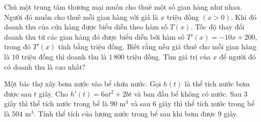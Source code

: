 \begin{bt}%
	Chủ một trung tâm thương mại muốn cho thuê một số gian hàng như nhau. Người đó muốn cho thuê mỗi gian  hàng với giá là $x$ triệu đồng $(x>0)$. Khi đó doanh thu của cửa hàng được biểu diễn theo hàm số $T(x)$. Tốc độ thay đổi doanh thu từ các gian hàng đó được biểu diễn bởi hàm số $T'(x)=-10x+200$, trong đó $T'(x)$ tính bằng triệu đồng. Biết rằng nếu giá thuê cho mỗi gian hàng là $10$ triệu đồng thì doanh thu là $1\,800$ triệu đồng. Tìm giá trị của $x$ để người đó có doanh thu là cao nhất?
\end{bt}

\begin{bt}%
	Một bác thợ xây bơm nước vào bể chứa nước. Gọi $h(t)$ là thể tích nước bơm được sau $t$ giây. Cho $h'(t)=6at^2+2bt$ và ban  đầu bể không có nước. Sau $3$ giây thì thể tích nước trong bể là $90$ m$^3$ và sau $6$ giây thì thể tích nước trong bể là $504$ m$^3$. Tính thể tích của lượng nước trong bể sau khi bơm được $9$ giây.
\end{bt}

